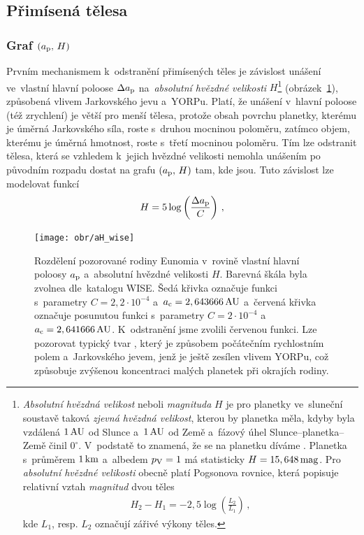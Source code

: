 \documentclass[A4paper, 12pt, oneside, openany]{book}
\begin{document}
\subsection{Přimísená tělesa} \label{sec:interlopers}

\subsubsection{Graf $(a_{\rm p},\,H)$}


Prvním mechanismem k~odstranění přimísených těles je závislost unášení ve~vlastní hlavní poloose $\Delta a_{\rm p}$ na~\textit{absolutní hvězdné velikosti} $H$\footnote{\textit{Absolutní hvězdná velikost} neboli \textit{magnituda} $H$ je pro planetky ve~sluneční soustavě taková \textit{zjevná hvězdná velikost}, kterou by planetka měla, kdyby byla vzdálená $1\,{\rm AU}$ od Slunce a~$1\,{\rm AU}$ od Země a~fázový úhel Slunce--planetka--Země činil $0^\circ$. V~podstatě to znamená, že se na planetku díváme . Planetka s~průměrem $1\,{\rm km}$ a~albedem $p_{\rm V}=1$ má statisticky $H=15,648\,{\rm mag}$. Pro \textit{absolutní hvězdné velikosti} obecně platí Pogsonova rovnice, která popisuje relativní vztah \textit{magnitud} dvou těles
\begin{align*}
	H_2-H_1=-2,5\log\left(\frac{L_2}{L_1}\right)\,,
\end{align*}
kde $L_1$, resp. $L_2$ označují zářivé výkony těles.}
(obrázek~\ref{fig:aH_wise}), způsobená vlivem Jarkovského jevu a~YORPu. Platí, že unášení v~hlavní poloose (též zrychlení) je větší pro menší tělesa, protože obsah povrchu planetky, kterému je úměrná Jarkovského síla, roste s~druhou mocninou poloměru, zatímco objem, kterému je úměrná hmotnost, roste s~třetí mocninou poloměru. Tím lze odstranit tělesa, která se vzhledem k~jejich hvězdné velikosti nemohla unášením po původním rozpadu dostat na grafu $(a_{\rm p},\,H)$ tam, kde jsou. Tuto závislost lze modelovat funkcí 
\begin{align}
	H=5\log\left(\frac{\Delta a_{\rm p}}{C}\right)\,,
\end{align}

\begin{figure}
	\centering
	\texttt{[image: obr/aH\_wise]}
	\caption{Rozdělení pozorované rodiny Eunomia v~rovině vlastní hlavní poloosy $a_{\rm p}$ a~absolutní hvězdné velikosti $H$. Barevná škála byla zvolnea dle~katalogu WISE. Šedá křivka označuje funkci s~parametry ${C=2,2\cdot10^{-4}}$ a~${a_{\rm c}=2,643666\,{\rm AU}}$ a~červená křivka označuje posunutou funkci s~parametry ${C=2\cdot10^{-4}}$ a~${a_{\rm c}=2,641666\,{\rm AU}}$. K~odstranění  jsme zvolili červenou funkci. Lze pozorovat typický tvar , který je způsobem počátečním rychlostním polem a~Jarkovského jevem, jenž je ještě zesílen vlivem YORPu, což způsobuje zvýšenou koncentraci malých planetek při okrajích rodiny.}
	\label{fig:aH_wise}
\end{figure}
\end{document}
